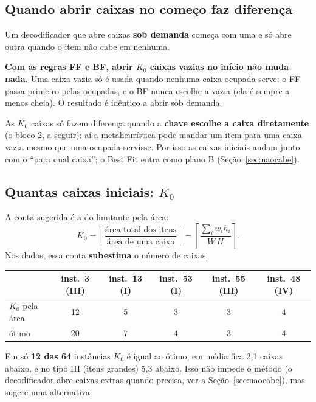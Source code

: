 \documentclass[11pt,a4paper]{article}
\begin{document}
\subsection{Quando abrir caixas no começo faz diferença}
Um decodificador que abre caixas \textbf{sob demanda} começa com uma e só abre outra quando o item não cabe em
nenhuma.

\textbf{Com as regras FF e BF, abrir $K_0$ caixas vazias no início não muda nada.} Uma caixa vazia só é usada quando
nenhuma caixa ocupada serve: o FF passa primeiro pelas ocupadas, e o BF nunca escolhe a vazia (ela é sempre a menos
cheia). O resultado é idêntico a abrir sob demanda.

As $K_0$ caixas só fazem diferença quando a \textbf{chave escolhe a caixa diretamente} (o bloco 2, a seguir): aí a
metaheurística pode mandar um item para uma caixa vazia mesmo que uma ocupada servisse. Por isso as caixas iniciais
andam junto com o ``para qual caixa''; o Best Fit entra como plano B (Seção~\ref{sec:naocabe}).

\subsection{Quantas caixas iniciais: $K_0$}
A conta sugerida é a do limitante pela área:
\[
K_0 = \left\lceil \frac{\text{área total dos itens}}{\text{área de uma caixa}} \right\rceil = \left\lceil
\frac{\sum_i w_i h_i}{W\,H} \right\rceil .
\]
Nos dados, essa conta \textbf{subestima} o número de caixas:

\begin{center}\small
\begin{tabular}{@{}lccccc@{}}
\toprule
& inst.\ 3 (III) & inst.\ 13 (I) & inst.\ 53 (I) & inst.\ 55 (III) & inst.\ 48 (IV) \\ \midrule
$K_0$ pela área & 12 & 5 & 3 & 3 & 4 \\
ótimo & 20 & 7 & 4 & 3 & 4 \\
\bottomrule
\end{tabular}
\end{center}

Em só \textbf{12 das 64} instâncias $K_0$ é igual ao ótimo; em média fica 2,1 caixas abaixo, e no tipo III (itens
grandes) 5,3 abaixo. Isso não impede o método (o decodificador abre caixas extras quando precisa, ver a
Seção~\ref{sec:naocabe}), mas sugere uma alternativa:
\end{document}
